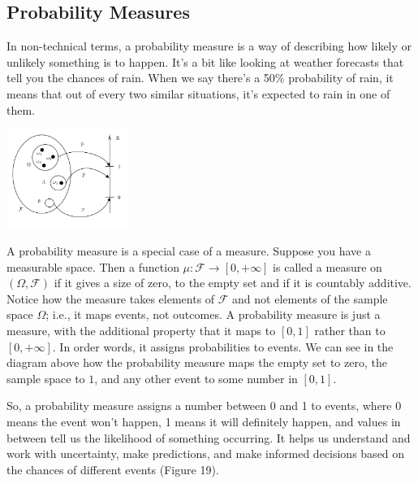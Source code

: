 \documentclass{tufte-handout}
\newcommand{\bmp}[1]{\begin{minipage}{#1}}
\newcommand{\emp}{\end{minipage}}
\newcommand{\tw}{\textwidth}
\begin{document}


\subsection{Probability Measures}

In non-technical terms, a probability measure is a way of describing how likely or unlikely something is to happen. It's a bit like looking at weather forecasts that tell you the chances of rain. When we say there's a 50\% probability of rain, it means that out of every two similar situations, it's expected to rain in one of them.

\begin{marginfigure}
\centering
\includegraphics[width=4cm]{fig/pm.png}
\caption{A probability measure is a special case of a measure. Suppose you have a measurable space. Then a function $\mu: \mathcal F \rightarrow [0,+\infty]$ is called a measure on $(\Omega, \mathcal F)$
 if it gives a size of zero, to the empty set and if it is countably additive. Notice how the measure takes elements of $\mathcal F$ and not elements of the sample space $\Omega$; i.e.,  it maps events, not outcomes. A probability measure is just a measure,  with the additional property that it maps to $[0,1]$ rather than to $[0,+\infty]$. In order words, it assigns probabilities to events. We can see in the diagram above how the probability measure maps the empty set to zero, the sample space to  $1$, and any other event to some number in $[0,1]$.
}
\end{marginfigure}


So, a probability measure assigns a number between 0 and 1 to events, where 0 means the event won't happen, 1 means it will definitely happen, and values in between tell us the likelihood of something occurring. It helps us understand and work with uncertainty, make predictions, and make informed decisions based on the chances of different events (Figure 19).
\end{document}
